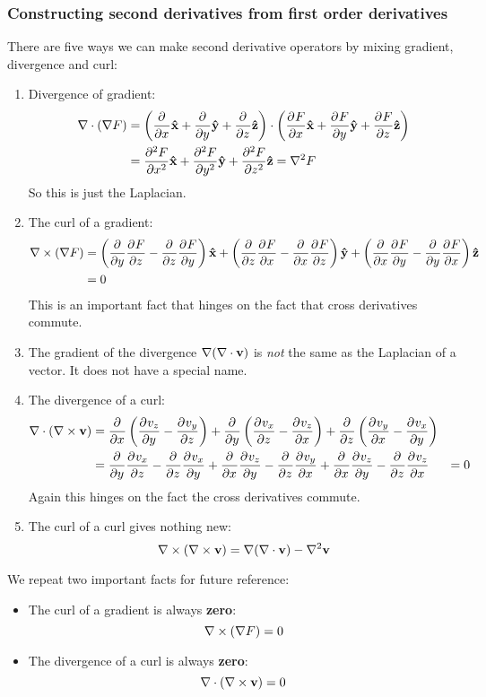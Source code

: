 \subsubsection{Constructing second derivatives from first order derivatives}
There are five ways we can make second derivative operators by mixing gradient, divergence and curl:
\begin{enumerate}
\item Divergence of gradient:
\begin{align*}
\nabla\cdot (\grad F) &= \left(\pd{}{x}\vhat{x} + \pd{}{y}\vhat{y} + \pd{}{z}\vhat{z}\right)\cdot \left(\pd{F}{x}\vhat{x} + \pd{F}{y}\vhat{y} + \pd{F}{z}\vhat{z}\right) \\
&= \pd[2]{F}{x}\vhat{x} + \pd[2]{F}{y}\vhat{y} + \pd[2]{F}{z}\vhat{z} = \nabla^2 F
\end{align*}
So this is just the Laplacian.
\item The curl of a gradient:
\begin{align*}
\curl(\grad F) &= \left(\pd{}{y}\pd{F}{z} - \pd{}{z}\pd{F}{y}\right)\vhat{x} + \left(\pd{}{z}\pd{F}{x} - \pd{}{x}\pd{F}{z}\right)\vhat{y} + \left(\pd{}{x}\pd{F}{y} - \pd{}{y}\pd{F}{x}\right)\vhat{z} \\
&= 0
\end{align*}
This is an important fact that hinges on the fact that cross derivatives commute.
\item The gradient of the divergence $\grad(\nabla\cdot \vec{v})$ is \textit{not} the same as the Laplacian of a vector. It does not have a special name.
\item The divergence of a curl:
\begin{align*}
\nabla\cdot(\curl \vec{v}) &= \pd{}{x}\left(\pd{v_z}{y} - \pd{v_y}{z}\right) + \pd{}{y}\left(\pd{v_x}{z} - \pd{v_z}{x}\right) + \pd{}{z}\left(\pd{v_y}{x} - \pd{v_x}{y}\right) \\
&= \pd{}{y}\pd{v_x}{z} - \pd{}{z}\pd{v_x}{y} + \pd{}{x}\pd{v_z}{y} - \pd{}{z}\pd{v_y}{x} + \pd{}{x}\pd{v_z}{y} - \pd{}{z}\pd{v_z}{x}
&= 0
\end{align*}
Again this hinges on the fact the cross derivatives commute.
\item The curl of a curl gives nothing new:
\[ \curl(\curl \vec{v}) = \grad(\nabla\cdot \vec{v}) - \nabla^2 \vec{v} \]
\end{enumerate}
We repeat two important facts for future reference:
\begin{eigenschap}
\begin{itemize}
\item The curl of a gradient is always \textbf{zero}:
\[ \curl(\grad F) = 0 \]
\item The divergence of a curl is always \textbf{zero}:
\[ \nabla\cdot(\curl \vec{v}) = 0 \]
\end{itemize}
\end{eigenschap}

